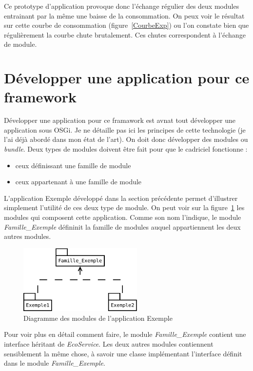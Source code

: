 \documentclass[a4paper, 11pt]{report}
\begin{document}
Ce prototype d'application provoque donc l'échange régulier des deux modules entrainant par la même une baisse de la consommation. On peux voir le résultat sur cette courbe de consommation (figure~\ref{CourbeExp}) ou l'on constate bien que régulièrement la courbe chute brutalement. Ces chutes correspondent à l'échange de module.

	\section{Développer une application pour ce framework}
Développer une application pour ce framawork est avnat tout développer une application sous OSGi. Je ne détaille pas ici les principes de cette technologie (je l'ai déjà abordé dans mon état de l'art). On doit donc développer des modules ou \textit{bundle}. Deux types de modules doivent être fait pour que le cadriciel fonctionne :
\begin{itemize}
  \item ceux définissant une famille de module
  \item ceux appartenant à une famille de module
\end{itemize}

L'application Exemple développé dans la section précédente permet d'illustrer simplement l'utilité de ces deux type de module. On peut voir sur la figure~\ref{BdlExp} les modules qui composent cette application. Comme son nom l'indique, le module \textit{Famille\_Exemple} défininit la famille de modules auquel appartiennent les deux autres modules.

\begin{figure}
	\centering
	\includegraphics[width=0.55\textwidth]{figures/EcoPattern_Exemple}
	\caption{Diagramme des modules de l'application Exemple}
	\label{BdlExp}
\end{figure}

Pour voir plus en détail comment faire, le module \textit{Famille\_Exemple} contient une interface héritant de \textit{EcoService}. Les deux autres modules contiennent sensiblement la même chose, à savoir une classe implémentant l'interface définit dans le module \textit{Famille\_Exemple}.
\end{document}
